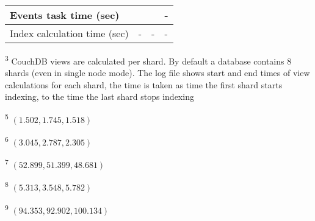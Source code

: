 \begin{table}[H]
\begin{threeparttable}
\begin{tabularx}{\textwidth}{>{\hsize}X>{\hsize}Y>{\hsize}Y>{\hsize}Y}
            Events task time (sec)       &                                  &                                   & -                                 \\
            \midrule
            Index calculation time (sec) & -                                & -                                 & -                                 \\
            \bottomrule
        \end{tabularx}
        \scriptsize
        \begin{tablenotes}
            \item[\textsuperscript{3}]CouchDB views are calculated per shard. By default a database contains 8 shards (even in single node mode). The log file shows start and end times of view calculations for each shard, the time is taken as time the first shard starts indexing, to the time the last shard stops indexing
            \item[\textsuperscript{5}]$(1.502, 1.745, 1.518)$
            \item[\textsuperscript{6}]$(3.045, 2.787, 2.305)$
            \item[\textsuperscript{7}]$(52.899, 51.399, 48.681)$
            \item[\textsuperscript{8}]$(5.313, 3.548, 5.782)$
            \item[\textsuperscript{9}]$(94.353, 92.902, 100.134)$
        \end{tablenotes}
    \end{threeparttable}
\end{table}